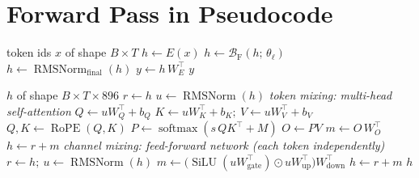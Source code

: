 \documentclass[10pt,a4paper]{article}
\newcommand{\op}[1]{\operatorname{#1}}
\theoremstyle{definition}
\begin{document}
\section{Forward Pass in Pseudocode}\label{sec:algo}
\begin{algorithm}[H]
\caption{Qwen2.5-0.5B-Instruct: full forward pass}
\begin{algorithmic}[1]
\Require token ids $x$ of shape $B\times T$
\State $h \gets E(x)$ 
 
\State $h \gets \mathcal{B}_{\mathrm{F}}(h;\,\theta_\ell)$ 
\EndFor
\State $h \gets \op{RMSNorm}_{\mathrm{final}}(h)$ 
\State $y \gets h\,W_E^{\top}$ 
\State \Return $y$ 
\end{algorithmic}
\end{algorithm}
\begin{algorithm}[H]
\caption{Block $\mathcal{B}_{\mathrm{F}}(h)$ --- Full (global) attention block}
\begin{algorithmic}[1]
\Require $h$ of shape $B\times T\times 896$
\State $r \gets h$ 
\State $u \gets \op{RMSNorm}(h)$ 
\Statex \hspace{-1.2em}\textit{token mixing: multi-head self-attention}
\State $Q \gets u W_Q^{\top} + b_Q$ 
\State $K \gets u W_K^{\top} + b_K;\ V \gets u W_V^{\top} + b_V$ 
\State $Q, K \gets \op{RoPE}(Q, K)$ 
\State $P \gets \op{softmax}(s\, Q K^{\top} + M)$ 
\State $O \gets P V$ 
\State $m \gets O\, W_O^{\top}$ 
\State $h \gets r + m$ 
\Statex \hspace{-1.2em}\textit{channel mixing: feed-forward network (each token independently)}
\State $r \gets h;\ u \gets \op{RMSNorm}(h)$
\State $m \gets \big(\op{SiLU}(u W_{\mathrm{gate}}^{\top}) \odot u W_{\mathrm{up}}^{\top}\big) W_{\mathrm{down}}^{\top}$ 
\State $h \gets r + m$ 
\State \Return $h$
\end{algorithmic}
\end{algorithm}
\end{document}
